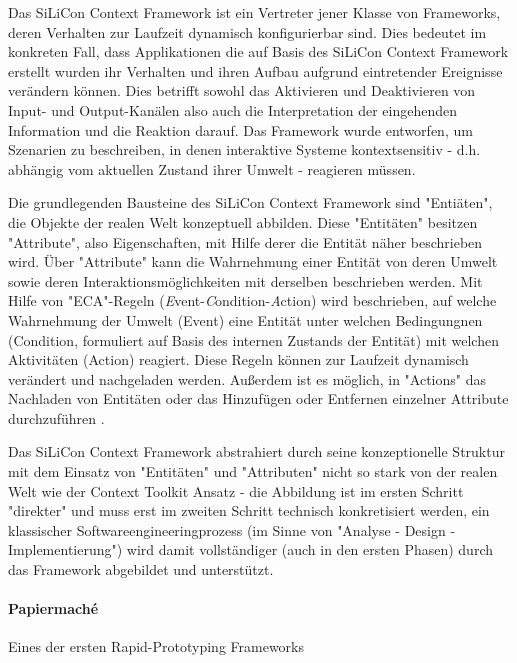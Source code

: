 Das SiLiCon Context Framework \citep{Beer03} ist ein Vertreter jener Klasse von Frameworks, deren Verhalten zur Laufzeit dynamisch konfigurierbar sind. Dies bedeutet im konkreten Fall, dass Applikationen die auf Basis des SiLiCon Context Framework erstellt wurden ihr Verhalten und ihren Aufbau aufgrund eintretender Ereignisse verändern können. Dies betrifft sowohl das Aktivieren und Deaktivieren von Input- und Output-Kanälen also auch die Interpretation der eingehenden Information und die Reaktion darauf. Das Framework wurde entworfen, um Szenarien zu beschreiben, in denen interaktive Systeme kontextsensitiv - d.h. abhängig vom aktuellen Zustand ihrer Umwelt - reagieren müssen.

Die grundlegenden Bausteine des SiLiCon Context Framework sind "Entiäten", die Objekte der realen Welt konzeptuell abbilden. Diese "Entitäten" besitzen "Attribute", also Eigenschaften, mit Hilfe derer die Entität näher beschrieben wird. Über "Attribute" kann die Wahrnehmung einer Entität von deren Umwelt sowie deren Interaktionsmöglichkeiten mit derselben beschrieben werden. Mit Hilfe von "ECA"-Regeln (\emph{E}vent-\emph{C}ondition-\emph{A}ction) wird beschrieben, auf welche Wahrnehmung der Umwelt (Event) eine Entität unter welchen Bedingungnen (Condition, formuliert auf Basis des internen Zustands der Entität) mit welchen Aktivitäten (Action) reagiert. Diese Regeln können zur Laufzeit dynamisch verändert und nachgeladen werden. Außerdem ist es möglich, in "Actions" das Nachladen von Entitäten oder das Hinzufügen oder Entfernen einzelner Attribute durchzuführen \citep[][S. 90]{Oppl04}.

Das SiLiCon Context Framework abstrahiert durch seine konzeptionelle Struktur mit dem Einsatz von "Entitäten" und "Attributen" nicht so stark von der realen Welt wie der Context Toolkit Ansatz - die Abbildung ist im ersten Schritt "direkter" und muss erst im zweiten Schritt technisch konkretisiert werden, ein klassischer Softwareengineeringprozess (im Sinne von "Analyse - Design - Implementierung") wird damit vollständiger (auch in den ersten Phasen) durch das Framework abgebildet und unterstützt. 


\paragraph{Papiermaché} %
\label{par:papiermaché}
Eines der ersten Rapid-Prototyping Frameworks

